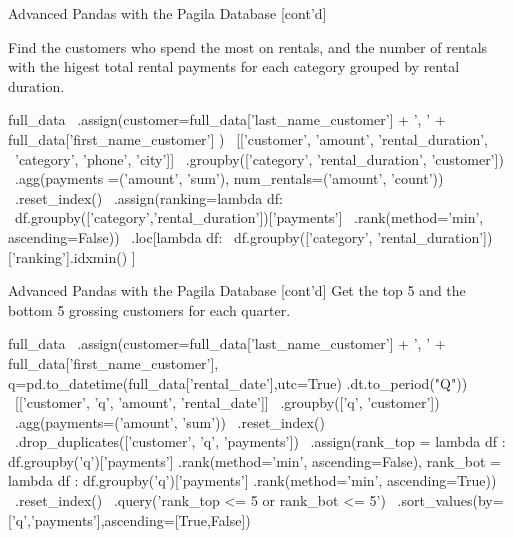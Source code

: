 \documentclass[ignorenonframetext,xcolor=x11names]{beamer}
\begin{document}
\begin{frame}[fragile]{Advanced Pandas with the Pagila Database \small [cont'd]}

Find the customers who spend the most on rentals, and the number of rentals with the higest total rental payments for each category grouped by rental duration.

\scriptsize
\begin{pythoncode}
full_data \
   .assign(customer=full_data['last_name_customer'] + ', ' + 
                    full_data['first_name_customer'] ) \
   [['customer', 'amount', 'rental_duration', \
     'category', 'phone', 'city']] \
   .groupby(['category', 'rental_duration', 'customer']) \
   .agg(payments =('amount', 'sum'), 
        num_rentals=('amount', 'count')) \
   .reset_index() \
   .assign(ranking=lambda df: \
      df.groupby(['category','rental_duration'])['payments'] \
        .rank(method='min', ascending=False)) \
    .loc[lambda df:  \
         df.groupby(['category', 'rental_duration'])
            ['ranking'].idxmin() ]
\end{pythoncode}
\end{frame}

\begin{frame}[fragile]{Advanced Pandas with the Pagila Database \small [cont'd]}
Get the top 5 and the bottom 5 grossing customers for each quarter.

\footnotesize
\begin{pythoncode}
full_data \
   .assign(customer=full_data['last_name_customer'] + ', ' + 
                    full_data['first_name_customer'],
           q=pd.to_datetime(full_data['rental_date'],utc=True)
                 .dt.to_period("Q"))  \
   [['customer', 'q', 'amount', 'rental_date']] \
   .groupby(['q', 'customer']) \
   .agg(payments=('amount', 'sum')) \
   .reset_index() \
   .drop_duplicates(['customer', 'q', 'payments']) \
   .assign(rank_top = lambda df : 
              df.groupby('q')['payments']
                .rank(method='min', ascending=False),
           rank_bot = lambda df : 
              df.groupby('q')['payments']
              .rank(method='min', ascending=True)) \
    .reset_index() \
    .query('rank_top <= 5 or rank_bot <= 5') \
    .sort_values(by=['q','payments'],ascending=[True,False]) 

\end{pythoncode}
\end{frame}
\end{document}
